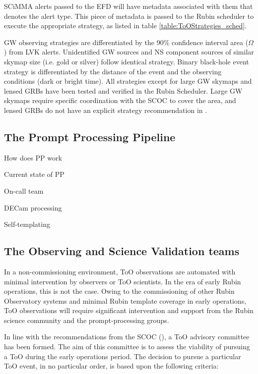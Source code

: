 SCiMMA alerts passed to the EFD will have metadata associated with them that denotes the alert type. This piece of metadata is passed to the Rubin scheduler to execute the appropriate strategy, as listed in table \ref{table:ToOStrategies_sched}.

GW observing strategies are differentiated by the 90\% confidence interval area ($\Omega$) from LVK alerts. Unidentified GW sources and NS component sources of similar skymap size (i.e. gold or silver) follow identical strategy. Binary black-hole event strategy is differentiated by the distance of the event and the observing conditions (dark or bright time). All strategies except for large GW skymaps and lensed GRBs have been tested and verified in the Rubin Scheduler. Large GW skymaps require specific coordination with the SCOC to cover the area, and lensed GRBs do not have an explicit strategy recommendation in \cite{RubinToO2024}.

\subsection{The Prompt Processing Pipeline}\label{subsec:PP}

How does PP work

Current state of PP

On-call team 

DECam processing

Self-templating

\subsection{The Observing and Science Validation teams}\label{subsec:ObsSVTeams}

In a non-commissioning environment, ToO observations are automated with minimal intervention by observers or ToO scientists. In the era of early Rubin operations, this is not the case. Owing to the commissioning of other Rubin Observatory systems and minimal Rubin template coverage in early operations, ToO observations will require significant intervention and support from the Rubin science community and the prompt-processing groups. 

In line with the recommendations from the SCOC (\cite{PSTN-056}), a ToO advisory committee has been formed. The aim of this committee is to assess the viability of pursuing a ToO during the early operations period. The decision to pursue a particular ToO event, in no particular order, is based upon the following criteria:

